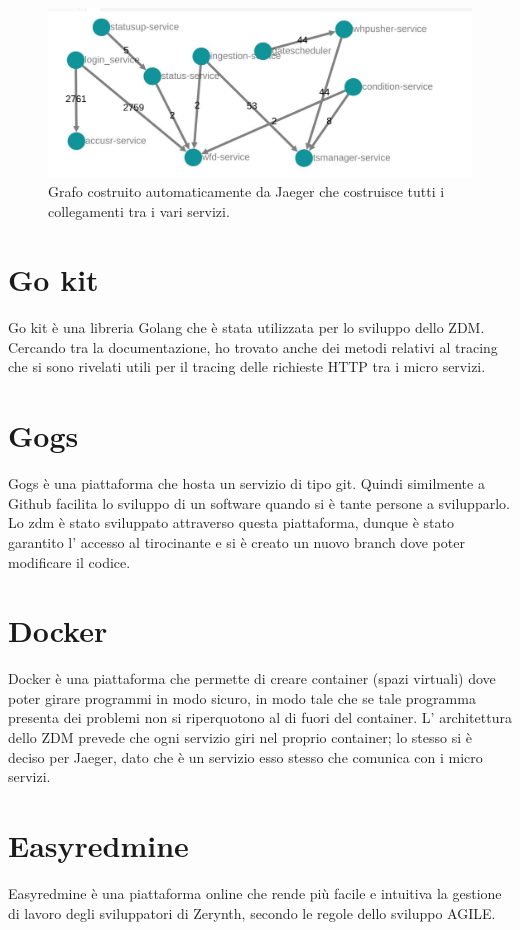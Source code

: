 \documentclass[a4paper,12pt,titlepage,italian,openany]{report}
\begin{document}
\begin{figure}[H]
    \includegraphics[scale=0.4]{grafo.jpg}
    \centering
    \caption{Grafo costruito automaticamente da Jaeger che costruisce tutti i collegamenti tra i vari servizi.}
\end{figure}

\section{Go kit}
Go kit\cite{go:2} è una libreria Golang che è stata utilizzata per lo sviluppo dello ZDM\cite{zdm:1}. Cercando tra la documentazione, ho trovato anche dei metodi relativi al tracing che si sono rivelati utili
per il tracing delle richieste HTTP tra i micro servizi. 
\section{Gogs}
Gogs\cite{gogs:1} è una piattaforma che hosta un servizio di tipo git. Quindi similmente a Github facilita lo sviluppo di un software quando si è tante persone a svilupparlo. Lo zdm è stato sviluppato attraverso questa piattaforma, dunque è stato garantito l' accesso al tirocinante e si è creato un nuovo branch dove poter modificare il codice. 

\section{Docker}
Docker\cite{docker:1} è una piattaforma che permette di creare container (spazi virtuali) dove poter girare programmi in modo sicuro, in modo tale che se tale programma presenta dei problemi non si riperquotono al di fuori del container. L' architettura dello ZDM\cite{zdm:1} prevede che ogni servizio giri nel proprio container; lo stesso si è deciso per Jaeger, dato che è un servizio esso stesso che comunica con i micro servizi.
\section{Easyredmine}
Easyredmine\cite{easyredmine:1} è una piattaforma online che rende più facile e intuitiva la gestione di lavoro degli sviluppatori di Zerynth, secondo le regole dello sviluppo AGILE.
\end{document}
